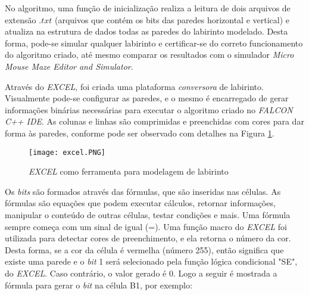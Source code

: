 No algoritmo, uma função de inicialização realiza a leitura de dois arquivos de extensão $.txt$ (arquivos que contém os bits das paredes horizontal e vertical) e atualiza na estrutura de dados todas as paredes do labirinto modelado. Desta forma, pode-se simular qualquer labirinto e certificar-se do correto funcionamento do algoritmo criado, até mesmo comparar os resultados com o simulador \emph{Micro Mouse Maze Editor and Simulator}.



Através do \textit{EXCEL}, foi criada uma plataforma \textit{conversora} de labirinto. Visualmente pode-se configurar as paredes, e o mesmo é encarregado de gerar informações binárias necessárias para executar o algoritmo criado no \textit{FALCON C++ IDE}. As colunas e linhas são comprimidas e preenchidas com cores para dar forma às paredes, conforme pode ser observado com detalhes na Figura \ref{fig:Modelagem}.

\begin{figure}[!htb]
	\caption{\label{fig:Modelagem}\textit{EXCEL} como ferramenta para modelagem de labirinto}
	\begin{center}
		\texttt{[image: excel.PNG]}
	\end{center}
\end{figure}

Os \textit{bits} são formados através das fórmulas, que são inseridas nas células. As fórmulas são equações que podem executar cálculos, retornar informações, manipular o conteúdo de outras células, testar condições e mais. Uma fórmula sempre começa com um sinal de igual (=). Uma função macro do \textit{EXCEL} foi utilizada para detectar cores de preenchimento, e ela retorna o número da cor. Desta forma, se a cor da célula é vermelha (número 255), então significa que existe uma parede e o \textit{bit} 1 será selecionado pela função lógica condicional "SE", do \textit{EXCEL}. Caso contrário, o valor gerado é 0. Logo a seguir é mostrada a fórmula para gerar o \textit{bit} na célula B1, por exemplo:

